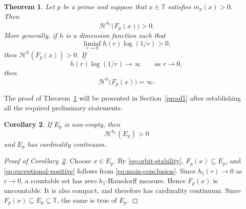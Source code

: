 \documentclass[11pt]{article}
\newtheorem{theorem}{Theorem}[section]
\newtheorem{corollary}[theorem]{Corollary}
\theoremstyle{remark}
\newcommand{\T}{\mathbb{T}}
\newcommand{\Haus}{\mathcal{H}}
\newcommand{\Fp}{F_p}
\newcommand{\mpc}{m_p}
\newcommand{\vp}[1]{{\color{red}  {#1}}}
\begin{document}
\begin{theorem}\label{mainTHM1}
Let $p$ be a prime and suppose that $x\in\T$ satisfies $\mpc(x)>0$.  Then
\begin{equation} \label{eq:main-conclusion}
    \Haus^{h_1}\bigl(\Fp(x)\bigr)>0.
\end{equation}
More generally, if $h$ is a dimension function such that
\begin{equation} \label{eq:gauge-positive}
    \liminf_{r\to0}h(r)\log(1/r)>0,
\end{equation}
then $\Haus^h(\Fp(x))>0$.  If
\begin{equation} \label{eq:gauge-infinite}
    h(r)\log(1/r)\longrightarrow\infty
    \qquad\text{as $r\to0$},
\end{equation}
then
\begin{equation} \label{eq:infinite-conclusion}
    \Haus^h\bigl(\Fp(x)\bigr)=\infty.
\end{equation}
\end{theorem}

The proof of Theorem~\ref{mainTHM1} will be presented in
Section~\ref{proof1} after establishing all the required preliminary
statements.

\begin{corollary}\label{cor_cardinal_cont}
If $E_p$ is non-empty, then
\begin{equation} \label{eq:exceptional-positive}
    \Haus^{h_1}(E_p)>0
\end{equation}
and $E_p$ has cardinality continuum.
\end{corollary}

\begin{proof}[Proof of Corollary~\ref{cor_cardinal_cont}]
Choose $x\in E_p$.  By \eqref{eq:orbit-stability}, $\Fp(x)\subseteq
E_p$, and \eqref{eq:exceptional-positive} follows from
\eqref{eq:main-conclusion}.  Since $h_1(r)\to0$ as $r\to0$, a
countable set has zero $h_1$-Hausdorff measure.  Hence $\Fp(x)$ is
uncountable.  It is also compact, and therefore has cardinality
continuum.  Since $\Fp(x)\subseteq E_p\subseteq\T$, the same is true
of $E_p$.
\end{proof}

%
\end{document}
